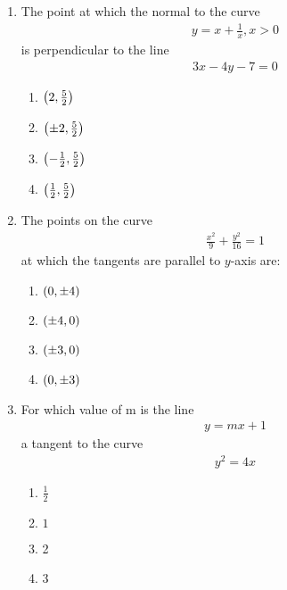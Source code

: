   \begin{enumerate}
        
\item The point at which the normal to the curve 
\begin{align}
    y = x+\frac{1}{x}, x>0 
\end{align}
 is perpendicular to the line
 \begin{align}
     3x-4y-7 = 0 
 \end{align}
\begin{enumerate}
    \item $\left(2,\frac{5}{2}\right)$   \item $\left(\pm2,\frac{5}{2}\right)$  

         \item $\left(-\frac{1}{2},\frac{5}{2}\right)$    \item $\left(\frac{1}{2},\frac{5}{2}\right)$
\end{enumerate}
         
         \item The points on the curve
         \begin{align}
             \frac{x^2}{9} +\frac{y^2}{16} = 1
         \end{align}
         at which the tangents are parallel to $y$-axis are:
         \begin{enumerate}
             \item $\left(0,\pm4\right)$   \item $\left(\pm4,0\right)$  

         \item  $\left(\pm3,0\right)$   \item $\left(0,\pm3\right)$
         \end{enumerate}
           
         \item For which value of m is the line
         \begin{align}
            y = mx + 1 
         \end{align}a tangent to the curve 
        \begin{align}
            y^2 = 4x 
        \end{align}
        \begin{enumerate}
            \item  $\frac{1}{2}$  \item $1$

         \item 2  \item 3
        \end{enumerate}
    \end{enumerate}

